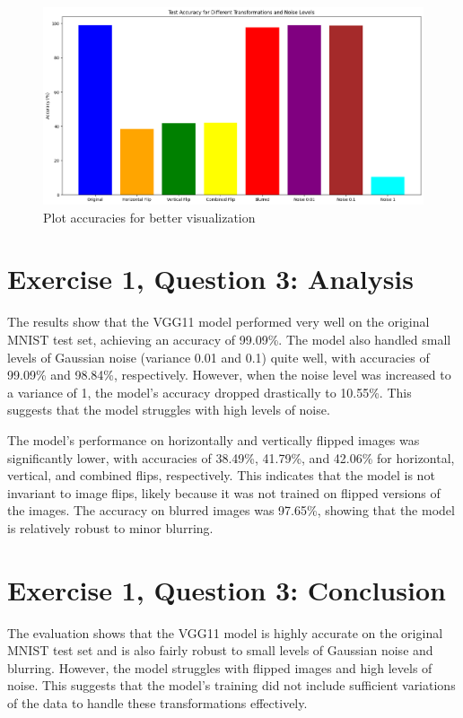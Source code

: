 \documentclass[10pt,letter,notitlepage]{article}
\begin{document}
\begin{center}
\begin{figure}[H]
  \includegraphics[width=\textwidth]{diffTransformNoise.png}
  \caption{Plot accuracies for better visualization}
\end{figure}


\section{Exercise 1, Question 3: Analysis}
The results show that the VGG11 model performed very well on the original MNIST test set, achieving an accuracy of 99.09\%. The model also handled small levels of Gaussian noise (variance 0.01 and 0.1) quite well, with accuracies of 99.09\% and 98.84\%, respectively. However, when the noise level was increased to a variance of 1, the model's accuracy dropped drastically to 10.55\%. This suggests that the model struggles with high levels of noise.

The model's performance on horizontally and vertically flipped images was significantly lower, with accuracies of 38.49\%, 41.79\%, and 42.06\% for horizontal, vertical, and combined flips, respectively. This indicates that the model is not invariant to image flips, likely because it was not trained on flipped versions of the images. The accuracy on blurred images was 97.65\%, showing that the model is relatively robust to minor blurring.

\section{Exercise 1, Question 3: Conclusion}
The evaluation shows that the VGG11 model is highly accurate on the original MNIST test set and is also fairly robust to small levels of Gaussian noise and blurring. However, the model struggles with flipped images and high levels of noise. This suggests that the model's training did not include sufficient variations of the data to handle these transformations effectively.


\end{center}
\end{document}
